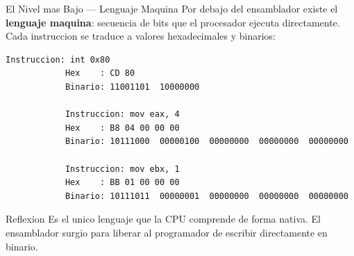 \documentclass[10pt, aspectratio=169]{beamer}
\begin{document}
	\begin{frame}[fragile]{El Nivel mas Bajo --- Lenguaje Maquina}
		Por debajo del ensamblador existe el \textbf{lenguaje maquina}: secuencia de bits
		que el procesador ejecuta directamente. Cada instruccion se traduce a valores
		hexadecimales y binarios:
		\vspace{0.2cm}
		\begin{lstlisting}[language={}]
			Instruccion: int 0x80
			Hex    : CD 80
			Binario: 11001101  10000000
			
			Instruccion: mov eax, 4
			Hex    : B8 04 00 00 00
			Binario: 10111000  00000100  00000000  00000000  00000000
			
			Instruccion: mov ebx, 1
			Hex    : BB 01 00 00 00
			Binario: 10111011  00000001  00000000  00000000  00000000
		\end{lstlisting}
		\vspace{0.1cm}
		\begin{block}{Reflexion}
			Es el unico lenguaje que la CPU comprende de forma nativa. El ensamblador
			surgio para liberar al programador de escribir directamente en binario.
		\end{block}
	\end{frame}
	
\end{document}
